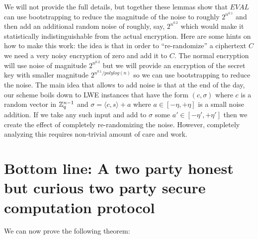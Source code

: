 
We will not provide the full details, but together these lemmas show
that \(\ensuremath{\mathit{EVAL}}\) can use bootstrapping to reduce the
magnitude of the noise to roughly \(2^{n^{0.1}}\) and then add an
additional random noise of roughly, say, \(2^{n^{0.2}}\) which would
make it statistically indistinguishable from the actual encryption. Here
are some hints on how to make this work: the idea is that in order to
``re-randomize'' a ciphertext \(C\) we need a very noisy encryption of
zero and add it to \(C\). The normal encryption will use noise of
magnitude \(2^{n^{0.2}}\) but we will provide an encryption of the
secret key with smaller magnitude \(2^{n^{0.1}/polylog(n)}\) so we can
use bootstrapping to reduce the noise. The main idea that allows to add
noise is that at the end of the day, our scheme boils down to LWE
instances that have the form \((c,\sigma)\) where \(c\) is a random
vector in \({\mathbb{Z}}_q^{n-1}\) and \(\sigma = \langle c,s \rangle+a\) where
\(a \in [-\eta,+\eta]\) is a small noise addition. If we take any such
input and add to \(\sigma\) some \(a' \in [-\eta',+\eta']\) then we
create the effect of completely re-randomizing the noise. However,
completely analyzing this requires non-trivial amount of care and work.

\section{Bottom line: A two party honest but curious two party secure
computation protocol}\label{Bottom-line-A-two-party-honest}

We can now prove the following theorem:

\hypertarget{twopartycthm}{}
